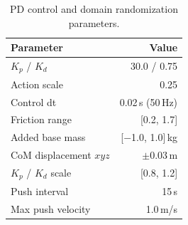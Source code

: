 \begin{table}[h]
	\centering
	\caption{PD control and domain randomization parameters.}
	\label{tab:control_dr}
	\small
	\begin{tabular}{@{}lr@{}}
		\toprule
		Parameter              & Value             \\
		\midrule
		$K_p$ / $K_d$          & 30.0 / 0.75       \\
		Action scale           & 0.25              \\
		Control dt             & 0.02\,s (50\,Hz)  \\
		\midrule
		Friction range         & [0.2, 1.7]        \\
		Added base mass        & [$-$1.0, 1.0]\,kg \\
		CoM displacement $xyz$ & $\pm$0.03\,m      \\
		$K_p$ / $K_d$ scale    & [0.8, 1.2]        \\
		Push interval          & 15\,s             \\
		Max push velocity      & 1.0\,m/s          \\
		\bottomrule
	\end{tabular}
\end{table}

